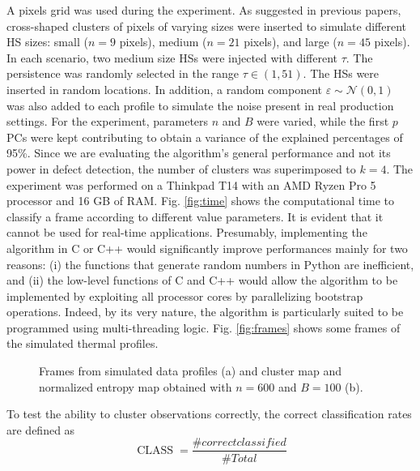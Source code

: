 A  pixels grid was used during the experiment. As suggested in previous papers, cross-shaped clusters of pixels of varying sizes were inserted to simulate different HS sizes: small ($n=9$ pixels), medium ($n=21$ pixels), and large ($n=45$ pixels). In each scenario, two medium size HSs were injected with different $\tau$. The persistence was randomly selected in the range $\tau\in (1,51)$. The HSs were inserted in random locations. In addition, a random component $\varepsilon \sim \mathcal{N}(0, 1)$ was also added to each profile to simulate the noise present in real production settings.
For the experiment, parameters $n$ and $B$ were varied, while the first $p$ PCs were kept contributing to obtain a variance of the explained percentages of 95\%. Since we are evaluating the algorithm's general performance and not its power in defect detection, the number of clusters was superimposed to $k=4$. The experiment was performed on a Thinkpad T14 with an AMD Ryzen Pro 5 processor and 16 GB of RAM. Fig. \ref{fig:time} shows the computational time to classify a frame according to different value parameters. It is evident that it cannot be used for real-time applications. Presumably, implementing the algorithm in C or C++ would significantly improve performances mainly for two reasons: (i) the functions that generate random numbers in Python are inefficient, and (ii) the low-level functions of C and C++ would allow the algorithm to be implemented by exploiting all processor cores by parallelizing bootstrap operations. Indeed, by its very nature, the algorithm is particularly suited to be programmed using multi-threading logic. Fig. \ref{fig:frames} shows some frames of the simulated thermal profiles.
\begin{figure}
    \centering
    \quad
    \caption[Frames of simulated data.]{Frames from simulated data profiles (a) and cluster map and normalized entropy map obtained with $n=600$ and $B=100$ (b).}
\end{figure}
To test the ability to cluster observations correctly, the correct classification rates are defined as
\begin{equation}
    \label{eq:classrate}
    \operatorname{CLASS} = \frac{\# correct classified}{\# Total}
\end{equation}


